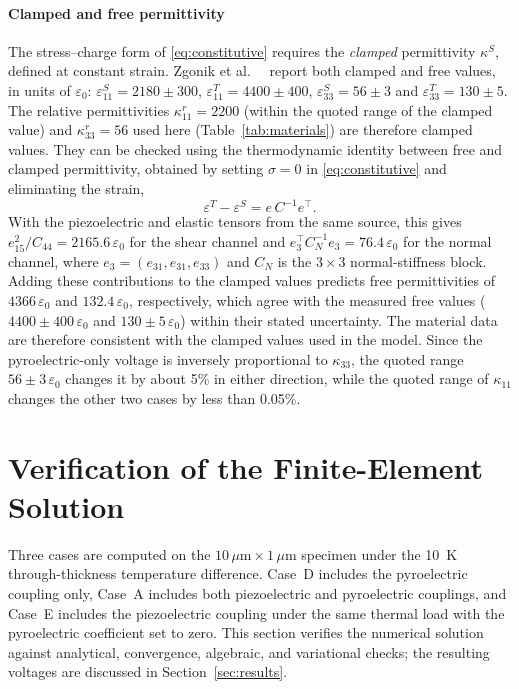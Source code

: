 \documentclass[pdflatex,sn-mathphys-num]{sn-jnl}
\begin{document}
\paragraph{Clamped and free permittivity}
The stress--charge form of \eqref{eq:constitutive} requires the \emph{clamped}
permittivity $\kappa^S$, defined at constant strain. Zgonik et al.\
~\cite{Zgonik1994} report both clamped and free values, in units of $\varepsilon_0$:
$\varepsilon_{11}^S=2180\pm300$, $\varepsilon_{11}^T=4400\pm400$,
$\varepsilon_{33}^S=56\pm3$ and $\varepsilon_{33}^T=130\pm5$. The relative
permittivities $\kappa_{11}^r=2200$ (within the quoted range of the clamped value)
and $\kappa_{33}^r=56$ used here (Table~\ref{tab:materials}) are therefore clamped
values. They can be checked using the thermodynamic identity between free and clamped
permittivity, obtained by setting $\sigma=0$ in \eqref{eq:constitutive} and eliminating
the strain,
\begin{equation}
\varepsilon^T-\varepsilon^S=e\,C^{-1}e^{\!\top}.
\label{eq:dielectric-identity}
\end{equation}
With the piezoelectric and elastic tensors from the same source, this gives
$e_{15}^2/C_{44}=2165.6\,\varepsilon_0$ for the shear channel and
$e_3^{\!\top}C_N^{-1}e_3=76.4\,\varepsilon_0$ for the normal channel, where
$e_3=(e_{31},e_{31},e_{33})$ and $C_N$ is the $3\times3$ normal-stiffness block.
Adding these contributions to the clamped values predicts free permittivities of
$4366\,\varepsilon_0$ and $132.4\,\varepsilon_0$, respectively, which agree with the
measured free values
($4400\pm400\,\varepsilon_0$ and $130\pm5\,\varepsilon_0$) within their stated
uncertainty. The material data are therefore consistent with the clamped values used
in the model. Since the pyroelectric-only voltage is inversely proportional to
$\kappa_{33}$, the quoted range $56\pm3\,\varepsilon_0$ changes it by about 5\% in
either direction, while the quoted range of $\kappa_{11}$ changes the other two cases
by less than 0.05\%.

\section{Verification of the Finite-Element Solution}
\label{sec:verification}

Three cases are computed on the $10\,\mu\text{m}\times1\,\mu\text{m}$ specimen under the
10~K through-thickness temperature difference. Case~D includes the pyroelectric
coupling only, Case~A includes both piezoelectric and pyroelectric couplings, and
Case~E includes the piezoelectric coupling under the same thermal load with the
pyroelectric coefficient set to zero. This section verifies the numerical solution
against analytical, convergence, algebraic, and variational checks; the resulting
voltages are discussed in Section~\ref{sec:results}.
\end{document}
